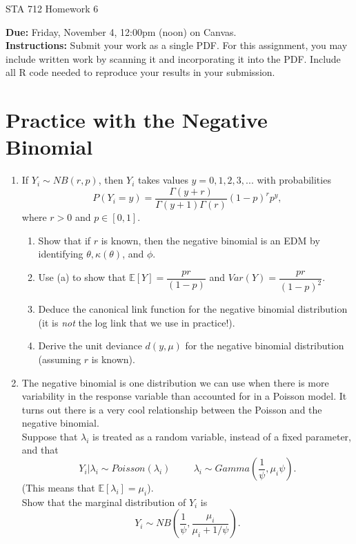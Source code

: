 \documentclass[11pt]{article}
\begin{document}
\begin{center}
\Large
STA 712 Homework 6\\
\normalsize
\vspace{5mm}
\end{center}

\noindent \textbf{Due:} Friday, November 4, 12:00pm (noon) on Canvas.\\ 

\noindent \textbf{Instructions:} Submit your work as a single PDF. For this assignment, you may include written work by scanning it and incorporating it into the PDF. Include all R code needed to reproduce your results in your submission.

\section*{Practice with the Negative Binomial}

\begin{enumerate}
\item If $Y_i \sim NB(r, p)$, then $Y_i$ takes values $y = 0, 1, 2, 3, ...$ with probabilities
$$P(Y_i = y) = \dfrac{\Gamma(y + r)}{\Gamma(y + 1)\Gamma(r)} (1 - p)^r p^y,$$
where $r > 0$ and $p \in [0,1]$.

\begin{enumerate}
\item Show that if $r$ is known, then the negative binomial is an EDM by identifying $\theta, \kappa(\theta)$, and $\phi$.
\item Use (a) to show that $\mathbb{E}[Y] = \dfrac{pr}{(1-p)}$ and $Var(Y) = \dfrac{p r}{(1 - p)^2}$.
\item Deduce the canonical link function for the negative binomial distribution (it is \textit{not} the log link that we use in practice!).
\item Derive the unit deviance $d(y,\mu)$ for the negative binomial distribution (assuming $r$ is known). 
\end{enumerate}

\item The negative binomial is one distribution we can use when there is more variability in the response variable than accounted for in a Poisson model. It turns out there is a very cool relationship between the Poisson and the negative binomial.\\

Suppose that $\lambda_i$ is treated as a random variable, instead of a fixed parameter, and that
$$Y_i | \lambda_i \sim Poisson(\lambda_i) \hspace{1cm} \lambda_i \sim Gamma\left(\dfrac{1}{\psi}, \mu_i \psi\right).$$
(This means that $\mathbb{E}[\lambda_i] = \mu_i$).\\

Show that the marginal distribution of $Y_i$ is 
$$Y_i \sim NB \left( \dfrac{1}{\psi}, \dfrac{\mu_i}{\mu_i + 1/\psi}\right).$$
\end{enumerate}
\end{document}
